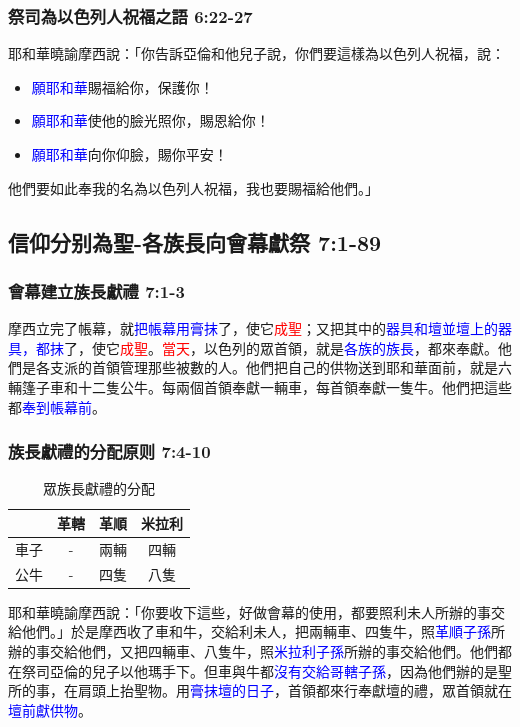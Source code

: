 \subsubsection{祭司為以色列人祝福之語 6:22-27}
耶和華曉諭摩西說：「你告訴亞倫和他兒子說，你們要這樣為以色列人祝福，說：
\vspace*{-2mm}
\begin{itemize} 
\itemsep-.35em
\item \textcolor{blue}{願耶和華}賜福給你，保護你！
\item \textcolor{blue}{願耶和華}使他的臉光照你，賜恩給你！
\item \textcolor{blue}{願耶和華}向你仰臉，賜你平安！
\end{itemize} 
\vspace*{-2mm}
他們要如此奉我的名為以色列人祝福，我也要賜福給他們。」


\subsection{信仰分别為聖-各族長向會幕獻祭 7:1-89}
\subsubsection{會幕建立族長獻禮 7:1-3}
摩西立完了帳幕，就\textcolor{blue}{把帳幕用膏抹}了，使它\textcolor{red}{成聖}；又把其中的\textcolor{blue}{器具和壇並壇上的器具，都抹}了，使它\textcolor{red}{成聖}。\textcolor{red}{當天}，以色列的眾首領，就是\textcolor{blue}{各族的族長}，都來奉獻。他們是各支派的首領管理那些被數的人。他們把自己的供物送到耶和華面前，就是六輛篷子車和十二隻公牛。每兩個首領奉獻一輛車，每首領奉獻一隻牛。他們把這些都\textcolor{blue}{奉到帳幕前}。

\subsubsection{族長獻禮的分配原则 7:4-10}
\begin{table}
\centering
\begin{tabular}{|c|c|c|c|}
\hline
\hline
     &革轄 &革順  & 米拉利    \\
\hline
車子 & -   & 兩輛&四輛   \\
\hline
公牛&- &四隻&八隻  \\ 
\hline
\end{tabular}
\caption{眾族長獻禮的分配}
\end{table}
耶和華曉諭摩西說：「你要收下這些，好做會幕的使用，都要照利未人所辦的事交給他們。」於是摩西收了車和牛，交給利未人，把兩輛車、四隻牛，照\textcolor{blue}{革順子孫}所辦的事交給他們，又把四輛車、八隻牛，照\textcolor{blue}{米拉利子孫}所辦的事交給他們。他們都在祭司亞倫的兒子以他瑪手下。但車與牛都\textcolor{blue}{沒有交給哥轄子孫}，因為他們辦的是聖所的事，在肩頭上抬聖物。用\textcolor{blue}{膏抹壇的日子}，首領都來行奉獻壇的禮，眾首領就在\textcolor{blue}{壇前獻供物}。

